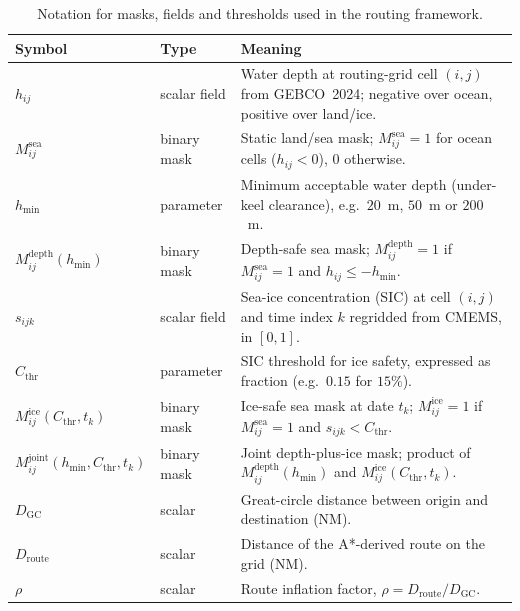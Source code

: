 \begin{table}[htbp]
  \centering
  \caption{Notation for masks, fields and thresholds used in the routing framework.}
  \label{tab:notation_masks}
  \begin{tabular}{llp{7cm}}
    \hline
    Symbol & Type & Meaning \\
    \hline
    $h_{ij}$ &
    scalar field &
    Water depth at routing-grid cell $(i,j)$ from GEBCO~2024; negative over ocean, positive over land/ice. \\[3pt]

    $M^{\mathrm{sea}}_{ij}$ &
    binary mask &
    Static land/sea mask; $M^{\mathrm{sea}}_{ij}=1$ for ocean cells ($h_{ij}<0$), $0$ otherwise. \\[3pt]

    $h_{\min}$ &
    parameter &
    Minimum acceptable water depth (under-keel clearance), e.g.\ $20$~m, $50$~m or $200$~m. \\[3pt]

    $M^{\mathrm{depth}}_{ij}(h_{\min})$ &
    binary mask &
    Depth-safe sea mask; $M^{\mathrm{depth}}_{ij}=1$ if $M^{\mathrm{sea}}_{ij}=1$ and $h_{ij}\le -h_{\min}$. \\[3pt]

    $s_{ijk}$ &
    scalar field &
    Sea-ice concentration (SIC) at cell $(i,j)$ and time index $k$ regridded from CMEMS, in $[0,1]$. \\[3pt]

    $C_{\mathrm{thr}}$ &
    parameter &
    SIC threshold for ice safety, expressed as fraction (e.g.\ $0.15$ for $15\%$). \\[3pt]

    $M^{\mathrm{ice}}_{ij}(C_{\mathrm{thr}}, t_k)$ &
    binary mask &
    Ice-safe sea mask at date $t_k$; $M^{\mathrm{ice}}_{ij}=1$ if $M^{\mathrm{sea}}_{ij}=1$ and $s_{ijk}<C_{\mathrm{thr}}$. \\[3pt]

    $M^{\mathrm{joint}}_{ij}(h_{\min}, C_{\mathrm{thr}}, t_k)$ &
    binary mask &
    Joint depth-plus-ice mask; product of $M^{\mathrm{depth}}_{ij}(h_{\min})$ and $M^{\mathrm{ice}}_{ij}(C_{\mathrm{thr}}, t_k)$. \\[3pt]

    $D_{\mathrm{GC}}$ &
    scalar &
    Great-circle distance between origin and destination (NM). \\[3pt]

    $D_{\mathrm{route}}$ &
    scalar &
    Distance of the A*-derived route on the grid (NM). \\[3pt]

    $\rho$ &
    scalar &
    Route inflation factor, $\rho = D_{\mathrm{route}} / D_{\mathrm{GC}}$. \\
    \hline
  \end{tabular}
\end{table}

\newpage
